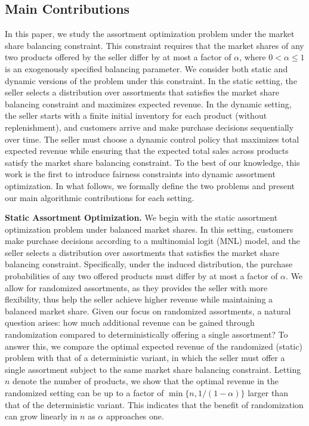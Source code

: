 \documentclass[mnsc,non-blindrev]{informs3}
\theoremstyle{definition}
\begin{document}
\subsection{Main Contributions}

  


In this paper, we study the assortment optimization problem under the market share balancing constraint. This constraint requires that the market shares of any two products offered by the seller differ by at most a factor of $\alpha$, where $0 < \alpha \leq 1$ is an exogenously specified balancing parameter. We consider both static and dynamic versions of the problem under this constraint. In the static setting, the seller selects a distribution over assortments that satisfies the market share balancing constraint and maximizes expected revenue. In the dynamic setting, the seller starts with a finite initial inventory for each product (without replenishment), and customers arrive and make purchase decisions sequentially over time. The seller must choose a dynamic control policy that maximizes total expected revenue while ensuring that the expected total sales across products satisfy the market share balancing constraint. To the best of our knowledge, this work is the first to introduce fairness constraints into dynamic assortment optimization.
In what follows, we formally define the two problems and present our main algorithmic contributions for each setting.


\vspace{2mm}
\noindent\textbf{Static Assortment Optimization.} We begin with the static assortment optimization problem under balanced market shares. In this setting, customers make purchase decisions according to a multinomial logit (MNL) model, and the seller selects a distribution over assortments that satisfies the market share balancing constraint. Specifically, under the induced distribution, the purchase probabilities of any two offered products must differ by at most a factor of $\alpha$.
We allow for randomized assortments, as they provides the seller with more flexibility, thus help the seller achieve higher revenue while maintaining a balanced market share. Given our focus on randomized assortments, a natural question arises: how much additional revenue can be gained through randomization compared to deterministically offering a single assortment? 
To answer this, we compare the optimal expected revenue of the randomized (static) problem with that of a deterministic variant, in which the seller must offer a single assortment subject to the same market share balancing constraint. Letting $n$ denote the number of products, we show that the optimal revenue in the randomized setting can be up to a factor of $\min\{n, 1/(1 - \alpha)\}$ larger than that of the deterministic variant. This indicates that the benefit of randomization can grow linearly in $n$ as $\alpha$ approaches one.
\end{document}
